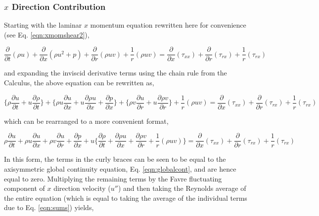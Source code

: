 \subsubsection{$x$ Direction Contribution}

	Starting with the laminar $x$ momentum equation rewritten here for
convenience (see Eq. \ref{eqn:xmomshear2}),

\begin{displaymath}
	\frac{\partial}{\partial t}(\rho u) + \frac{\partial}{\partial x}(\rho u^2 + p) +
	\frac{\partial}{\partial r}(\rho uv) + \frac{1}{r}(\rho u v) =  
	\frac{\partial}{\partial x}(\tau_{xx}) + \frac{\partial}{\partial r}(\tau_{rx}) + \frac{1}{r}(\tau_{rx})
\end{displaymath}

	and expanding the inviscid derivative terms using the chain rule from the Calculus, the above equation can
be rewritten as,

\begin{displaymath}
	\Big\{\rho \frac{\partial u}{\partial t} + u\frac{\partial \rho}{\partial t}\Big\} + \Big\{
	\rho u \frac{\partial u}{\partial x} + u \frac{\partial \rho u}{\partial x} + \frac{\partial p}{\partial x}\Big\} 
	+ \Big\{\rho v \frac{\partial u}{\partial r} + u\frac{\partial \rho v}{\partial r}\Big\} + \frac{1}{r}(\rho u v) =  
	 \frac{\partial}{\partial x}(\tau_{xx}) + \frac{\partial}{\partial r}(\tau_{rx}) + \frac{1}{r}(\tau_{rx})
\end{displaymath}
	
	which can be rearranged to a more convenient format,

\begin{displaymath}
	\rho \frac{\partial u}{\partial t} + \rho u \frac{\partial u}{\partial x} 
	+ \rho v \frac{\partial u}{\partial r}  + \frac{\partial p}{\partial x} + 
	u\Big\{\frac{\partial \rho}{\partial t} +\frac{\partial \rho u}{\partial x} + 
	\frac{\partial \rho v}{\partial r} + \frac{1}{r}(\rho u v)\Big\} =  
	 \frac{\partial}{\partial x}(\tau_{xx}) + \frac{\partial}{\partial r}(\tau_{rx}) + \frac{1}{r}(\tau_{rx})
\end{displaymath}

	In this form, the terms in the curly braces can be seen to be equal to the axisymmetric global continuity equation,
Eq. \ref{eqn:globalcont}, and are hence equal to zero.  Multiplying the remaining terms by the Favre fluctuating component
of $x$ direction velocity ($u''$) and then taking the Reynolds average of the entire equation (which is equal to taking the
average of the individual terms due to Eq. \ref{eqn:sums}) yields,

